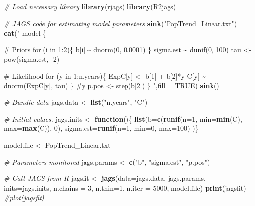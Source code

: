 \documentclass[
]{krantz}
\makeatletter
\newenvironment{Shaded}{\begin{snugshade}}{\end{snugshade}}
\newcommand{\AttributeTok}[1]{\textcolor[rgb]{0.27,0.27,0.27}{#1}}
\newcommand{\CommentTok}[1]{\textcolor[rgb]{0.37,0.37,0.37}{\textit{#1}}}
\newcommand{\ConstantTok}[1]{\textcolor[rgb]{0.37,0.37,0.37}{#1}}
\newcommand{\ControlFlowTok}[1]{\textcolor[rgb]{0.27,0.27,0.27}{\textbf{#1}}}
\newcommand{\DecValTok}[1]{\textcolor[rgb]{0.06,0.06,0.06}{#1}}
\newcommand{\FunctionTok}[1]{\textcolor[rgb]{0.27,0.27,0.27}{\textbf{#1}}}
\newcommand{\NormalTok}[1]{#1}
\newcommand{\OtherTok}[1]{\textcolor[rgb]{0.37,0.37,0.37}{#1}}
\newcommand{\StringTok}[1]{\textcolor[rgb]{0.5,0.5,0.5}{#1}}
\newenvironment{kframe}{%
\medskip{}
\setlength{\fboxsep}{.8em}
 \def\at@end@of@kframe{}%
 \ifinner\ifhmode%
  \def\at@end@of@kframe{\end{minipage}}%
  \begin{minipage}{\columnwidth}%
 \fi\fi%
 \def\FrameCommand##1{\hskip\@totalleftmargin \hskip-\fboxsep
 \colorbox{shadecolor}{##1}\hskip-\fboxsep
     \hskip-\linewidth \hskip-\@totalleftmargin \hskip\columnwidth}%
 \MakeFramed {\advance\hsize-\width
   \@totalleftmargin\z@ \linewidth\hsize
   \@setminipage}}%
 {\par\unskip\endMakeFramed%
 \at@end@of@kframe}
\renewenvironment{Shaded}{\begin{kframe}}{\end{kframe}}
\makeatother
\begin{document}
\begin{Shaded}
\begin{Highlighting}[]
\CommentTok{\# Load necessary library}
\FunctionTok{library}\NormalTok{(rjags)}
\FunctionTok{library}\NormalTok{(R2jags)}

\CommentTok{\# JAGS code for estimating model parameters}
\FunctionTok{sink}\NormalTok{(}\StringTok{"PopTrend\_Linear.txt"}\NormalTok{)}
\FunctionTok{cat}\NormalTok{(}\StringTok{"}
\StringTok{model \{}

\StringTok{\# Priors}
\StringTok{for (i in 1:2)\{}
\StringTok{  b[i] \textasciitilde{} dnorm(0, 0.0001)}
\StringTok{\}}
\StringTok{sigma.est \textasciitilde{} dunif(0, 100)}
\StringTok{tau \textless{}{-} pow(sigma.est, {-}2)}

\StringTok{  \# Likelihood}
\StringTok{  for (y in 1:n.years)\{}
\StringTok{  ExpC[y] \textless{}{-} b[1] + b[2]*y}
\StringTok{  C[y] \textasciitilde{} dnorm(ExpC[y], tau)}
\StringTok{  \} \#y}
\StringTok{  p.pos \textless{}{-} step(b[2])}
\StringTok{\}}
\StringTok{    "}\NormalTok{,}\AttributeTok{fill =} \ConstantTok{TRUE}\NormalTok{)}
\FunctionTok{sink}\NormalTok{()}

\CommentTok{\# Bundle data}
\NormalTok{jags.data }\OtherTok{\textless{}{-}} \FunctionTok{list}\NormalTok{(}\StringTok{"n.years"}\NormalTok{, }\StringTok{"C"}\NormalTok{)}

\CommentTok{\# Initial values.}
\NormalTok{jags.inits }\OtherTok{\textless{}{-}} \ControlFlowTok{function}\NormalTok{()\{ }\FunctionTok{list}\NormalTok{(}\AttributeTok{b=}\FunctionTok{c}\NormalTok{(}\FunctionTok{runif}\NormalTok{(}\AttributeTok{n=}\DecValTok{1}\NormalTok{, }\AttributeTok{min=}\FunctionTok{min}\NormalTok{(C), }\AttributeTok{max=}\FunctionTok{max}\NormalTok{(C)), }\DecValTok{0}\NormalTok{),}
                               \AttributeTok{sigma.est=}\FunctionTok{runif}\NormalTok{(}\AttributeTok{n=}\DecValTok{1}\NormalTok{, }\AttributeTok{min=}\DecValTok{0}\NormalTok{, }\AttributeTok{max=}\DecValTok{100}\NormalTok{)}
\NormalTok{                               )\}}

\NormalTok{model.file }\OtherTok{\textless{}{-}} \StringTok{\textquotesingle{}PopTrend\_Linear.txt\textquotesingle{}}

\CommentTok{\# Parameters monitored}
\NormalTok{jags.params }\OtherTok{\textless{}{-}} \FunctionTok{c}\NormalTok{(}\StringTok{"b"}\NormalTok{, }\StringTok{"sigma.est"}\NormalTok{, }\StringTok{"p.pos"}\NormalTok{)}

\CommentTok{\# Call JAGS from R}
\NormalTok{jagsfit }\OtherTok{\textless{}{-}} \FunctionTok{jags}\NormalTok{(}\AttributeTok{data=}\NormalTok{jags.data, jags.params, }\AttributeTok{inits=}\NormalTok{jags.inits,}
                \AttributeTok{n.chains =} \DecValTok{3}\NormalTok{, }\AttributeTok{n.thin=}\DecValTok{1}\NormalTok{, }\AttributeTok{n.iter =} \DecValTok{5000}\NormalTok{,}
\NormalTok{                model.file)}
\FunctionTok{print}\NormalTok{(jagsfit)}
\CommentTok{\#plot(jagsfit)}


\end{Highlighting}
\end{Shaded}
\end{document}
